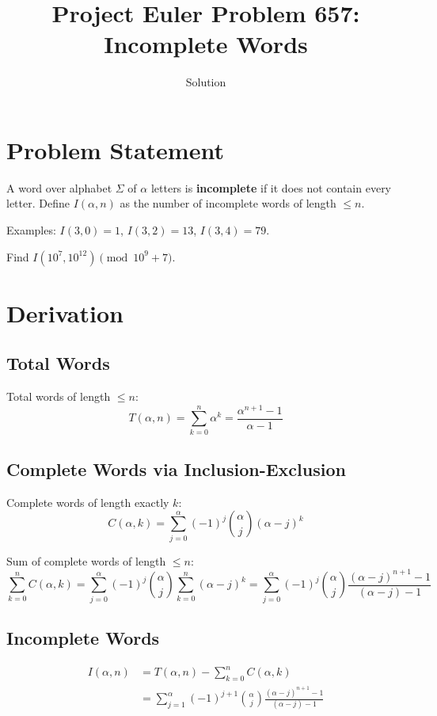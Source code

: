 \documentclass[12pt]{article}
\title{Project Euler Problem 657: Incomplete Words}
\author{Solution}
\date{}
\begin{document}
\maketitle

\section{Problem Statement}

A word over alphabet $\Sigma$ of $\alpha$ letters is \textbf{incomplete} if it does not contain every letter. Define $I(\alpha, n)$ as the number of incomplete words of length $\leq n$.

Examples: $I(3,0)=1$, $I(3,2)=13$, $I(3,4)=79$.

Find $I(10^7, 10^{12}) \pmod{10^9+7}$.

\section{Derivation}

\subsection{Total Words}

Total words of length $\leq n$:
\[
T(\alpha, n) = \sum_{k=0}^{n} \alpha^k = \frac{\alpha^{n+1}-1}{\alpha - 1}
\]

\subsection{Complete Words via Inclusion-Exclusion}

Complete words of length exactly $k$:
\[
C(\alpha, k) = \sum_{j=0}^{\alpha}(-1)^j\binom{\alpha}{j}(\alpha-j)^k
\]

Sum of complete words of length $\leq n$:
\[
\sum_{k=0}^n C(\alpha,k) = \sum_{j=0}^{\alpha}(-1)^j\binom{\alpha}{j}\sum_{k=0}^n (\alpha-j)^k
= \sum_{j=0}^{\alpha}(-1)^j\binom{\alpha}{j}\frac{(\alpha-j)^{n+1}-1}{(\alpha-j)-1}
\]

\subsection{Incomplete Words}

\begin{align}
I(\alpha, n) &= T(\alpha,n) - \sum_{k=0}^n C(\alpha,k) \\
&= \sum_{j=1}^{\alpha}(-1)^{j+1}\binom{\alpha}{j}\frac{(\alpha-j)^{n+1}-1}{(\alpha-j)-1}
\end{align}
\end{document}
